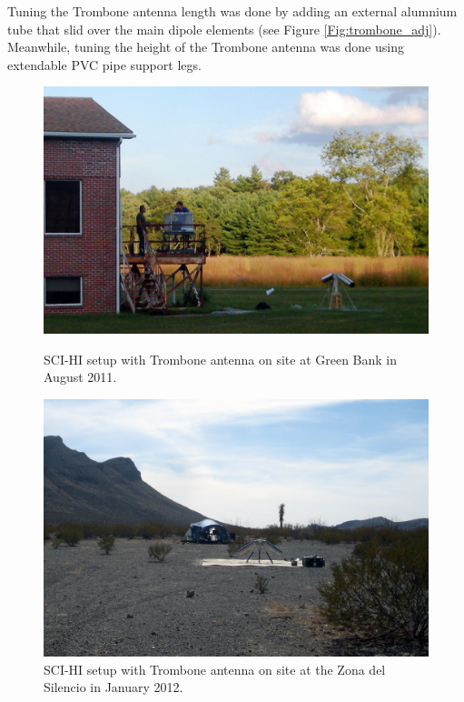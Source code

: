 Tuning the Trombone antenna length was done by adding an external alumnium tube that slid over the main dipole elements (see Figure \ref{Fig:trombone_adj}). Meanwhile, tuning the height of the Trombone antenna was done using extendable PVC pipe support legs.

\begin{figure}[htb]
\centering
\begin{minipage}[b]{0.48\textwidth}
\centering
\includegraphics[width=0.95\linewidth]{SCIHI_system/figures/trombone_gbt.jpg}
\caption{SCI-HI setup with Trombone antenna on site at Green Bank in August 2011.}
\label{Fig:trombone_gbt}
\end{minipage}%
\begin{minipage}[b]{0.02\textwidth}
\hspace{1cm}
\end{minipage}%
\begin{minipage}[b]{0.46\textwidth}
\centering
\includegraphics[width=0.95\linewidth]{SCIHI_system/figures/trombone_sys_ZdS.jpg}
\caption{SCI-HI setup with Trombone antenna on site at the Zona del Silencio in January 2012.}
\label{Fig:trombone_zds}
\end{minipage}
\end{figure}

